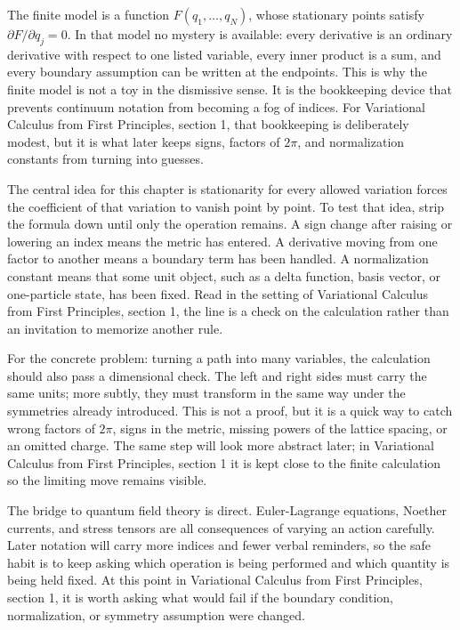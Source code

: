 The finite model is a function \(F(q_1,\ldots,q_N)\), whose stationary points satisfy \( \partial F/\partial q_j=0 \).  In that model no mystery is available: every derivative is an ordinary derivative with respect to one listed variable, every inner product is a sum, and every boundary assumption can be written at the endpoints.  This is why the finite model is not a toy in the dismissive sense.  It is the bookkeeping device that prevents continuum notation from becoming a fog of indices.  For Variational Calculus from First Principles, section 1, that bookkeeping is deliberately modest, but it is what later keeps signs, factors of \(2\pi\), and normalization constants from turning into guesses.

The central idea for this chapter is stationarity for every allowed variation forces the coefficient of that variation to vanish point by point.  To test that idea, strip the formula down until only the operation remains.  A sign change after raising or lowering an index means the metric has entered.  A derivative moving from one factor to another means a boundary term has been handled.  A normalization constant means that some unit object, such as a delta function, basis vector, or one-particle state, has been fixed.  Read in the setting of Variational Calculus from First Principles, section 1, the line is a check on the calculation rather than an invitation to memorize another rule.

For the concrete problem: turning a path into many variables, the calculation should also pass a dimensional check.  The left and right sides must carry the same units; more subtly, they must transform in the same way under the symmetries already introduced.  This is not a proof, but it is a quick way to catch wrong factors of \(2\pi\), signs in the metric, missing powers of the lattice spacing, or an omitted charge.  The same step will look more abstract later; in Variational Calculus from First Principles, section 1 it is kept close to the finite calculation so the limiting move remains visible.

The bridge to quantum field theory is direct.  Euler-Lagrange equations, Noether currents, and stress tensors are all consequences of varying an action carefully.  Later notation will carry more indices and fewer verbal reminders, so the safe habit is to keep asking which operation is being performed and which quantity is being held fixed.  At this point in Variational Calculus from First Principles, section 1, it is worth asking what would fail if the boundary condition, normalization, or symmetry assumption were changed.

